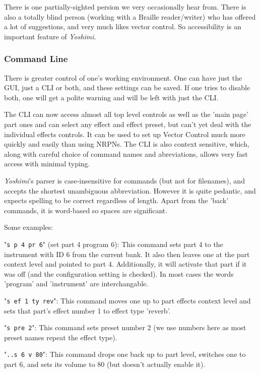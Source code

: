 \documentclass[
 11pt,
 twoside,
 a4paper,
 final                                 %
]{article}
\begin{document}
   There is one partially-sighted persion we very occasionally hear from. There
   is also a totally blind person (working with a Braille reader/writer) who has
   offered a lot of suggestions, and very much likes vector control.  So
   accessibility is an important feature of \textsl{Yoshimi}.

\subsubsection{Command Line}
\label{subsubsec:new_features_command_line}

   There is greater control of one's working environment. One can have just the
   GUI, just a CLI or both, and these settings can be saved. If one tries to
   disable both, one will get a polite warning and will be left with just the
   CLI.

   The CLI can now access almost all top level controls as well as the 'main
   page' part ones and can select any effect and effect preset, but can't yet
   deal with the individual effects controls. It can be used to set up Vector
   Control much more quickly and easily than using NRPNs.  The CLI is also
   context sensitive, which, along with careful choice of command names and
   abreviations, allows very fast access with minimal typing.

   \textsl{Yoshimi}'s parser is case-insensitive for commands (but not for
   filenames), and accepts the shortest unambiguous abbreviation. However it is
   quite pedantic, and expects spelling to be correct regardless of length.
   Apart from the 'back' commands, it is word-based so spaces are significant.

   Some examples:

   "\texttt{s p 4 pr 6}" (set part 4 program 6):
   This command sets part 4 to the instrument with ID 6 from the current bank.
   It also then leaves one at the part context level and pointed to part 4.
   Additionally, it will activate that part if it was off (and the
   configuration setting is checked). In most cases the words 'program' and
   'instrument' are interchangable.

   "\texttt{s ef 1 ty rev}":
   This command moves one up to part effects context level and sets that part's
   effect number 1 to effect type 'reverb'.

   "\texttt{s pre 2}":
   This command sets preset number 2 (we use numbers here as most preset names
   repeat the effect type).

   "\texttt{..s 6 v 80}":
   This command drops one back up to part level, switches one to part 6, and
   sets its volume to 80 (but doesn't actually enable it).
\end{document}

